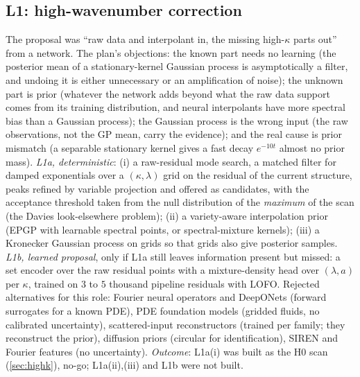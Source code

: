 \documentclass[11pt]{article}
\theoremstyle{plain}
\theoremstyle{definition}
\theoremstyle{remark}
\begin{document}
\subsection{L1: high-wavenumber correction}
The proposal was ``raw data and interpolant in, the missing high-$\kappa$ parts out'' from a network. The plan's objections: the known part needs no learning (the posterior mean of a stationary-kernel Gaussian process is asymptotically a filter, and undoing it is either unnecessary or an amplification of noise);
the unknown part is prior (whatever the network adds beyond what the raw data support comes from its training distribution, and neural interpolants have more spectral bias than a Gaussian process); the Gaussian process is the wrong input (the raw observations, not the GP mean, carry the evidence); and the real cause is prior mismatch (a separable stationary kernel gives a fast decay $e^{-10t}$ almost no prior mass).
\emph{L1a, deterministic}: (i) a raw-residual mode search, a matched filter for damped exponentials over a $(\kappa,\lambda)$ grid on the residual of the current structure, peaks refined by variable projection and offered as candidates, with the acceptance threshold taken from the null distribution of the \emph{maximum} of the scan (the Davies look-elsewhere problem); (ii) a variety-aware interpolation prior (EPGP with learnable spectral points, or spectral-mixture kernels); (iii) a Kronecker Gaussian process on grids so that grids also give posterior samples.
\emph{L1b, learned proposal}, only if L1a still leaves information present but missed: a set encoder over the raw residual points with a mixture-density head over $(\lambda,a)$ per $\kappa$, trained on $3$ to $5$ thousand pipeline residuals with LOFO. Rejected alternatives for this role: Fourier neural operators and DeepONets (forward surrogates for a known PDE), PDE foundation models (gridded fluids, no calibrated uncertainty),
scattered-input reconstructors (trained per family; they reconstruct the prior), diffusion priors (circular for identification), SIREN and Fourier features (no uncertainty). \emph{Outcome}: L1a(i) was built as the H0 scan (\cref{sec:highk}), no-go; L1a(ii),(iii) and L1b were not built.
\end{document}
